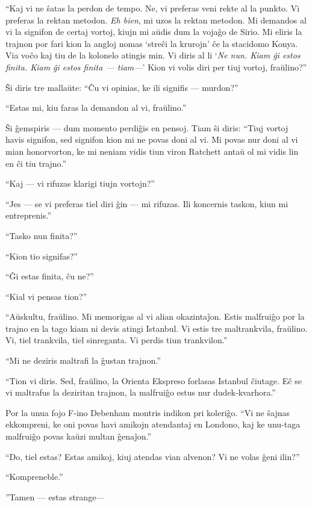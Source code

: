 ``Kaj vi ne ŝatas la perdon de tempo. Ne, vi preferas veni rekte al la punkto. Vi preferas la rektan metodon. \emph{Eh bien}, mi uzos la rektan metodon. Mi demandos al vi la signifon de certaj vortoj, kiujn mi aŭdis dum la vojaĝo de Sirio. Mi eliris la trajnon por fari kion la angloj nomas `streĉi la krurojn' ĉe la stacidomo Konya. Via voĉo kaj tiu de la kolonelo atingis min. Vi diris al li `\emph{Ne nun. Kiam ĝi estos finita. Kiam ĝi estos finita --- tiam---}' Kion vi volis diri per tiuj vortoj, fraŭlino?''

Ŝi diris tre mallaŭte: ``Ĉu vi opinias, ke ili signifis --- murdon?''

``Estas mi, kiu faras la demandon al vi, fraŭlino.''

Ŝi ĝemspiris --- dum momento perdiĝis en pensoj. Tiam ŝi diris: ``Tiuj vortoj havis signifon, sed signifon kion mi ne povas doni al vi. Mi povas nur doni al vi mian honorvorton, ke mi neniam vidis tiun viron Ratchett antaŭ ol mi vidis lin en ĉi tiu trajno.''

``Kaj --- vi rifuzas klarigi tiujn vortojn?''

``Jes --- se vi preferas tiel diri ĝin --- mi rifuzas. Ili koncernis taskon, kiun mi entreprenis.''

``Tasko nun finita?''

``Kion tio signifas?''

``Ĝi estas finita, ĉu ne?''

``Kial vi pensas tion?''

``Aŭskultu, fraŭlino. Mi memorigas al vi alian okazintaĵon. Estis malfruiĝo por la trajno en la tago kiam ni devis atingi Istanbul. Vi estis tre maltrankvila, fraŭlino. Vi, tiel trankvila, tiel sinreganta. Vi perdis tiun trankvilon.''

``Mi ne deziris maltrafi la ĝustan trajnon.''

``Tion vi diris. Sed, fraŭlino, la Orienta Ekspreso forlasas Istanbul ĉiutage. Eĉ se vi maltrafus la deziritan trajnon, la malfruiĝo estus nur dudek-kvarhora.''

Por la unua fojo F-ino Debenham montris indikon pri koleriĝo. ``Vi ne ŝajnas ekkompreni, ke oni povas havi amikojn atendantaj en Londono, kaj ke unu-taga malfruiĝo povas kaŭzi multan ĝenaĵon.''

``Do, tiel estas? Estas amikoj, kiuj atendas vian alvenon? Vi ne volas ĝeni ilin?''

``Kompreneble.''

''Tamen --- estas strange---

